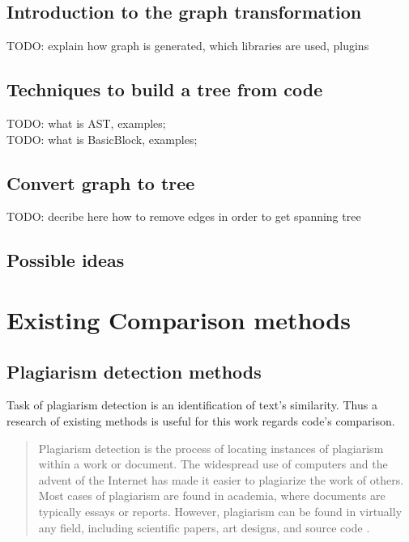 \documentclass{report}
\begin{document}
\section{Introduction to the graph transformation}
\label{sec:graph-transformation}

TODO: explain how graph is generated, which libraries are used, plugins

\section{Techniques to build a tree from code}
TODO: what is AST, examples;
\\
TODO: what is BasicBlock, examples;

\section{Convert graph to tree}
\label{sec: generate-to-tree}
TODO: decribe here how to remove edges in order to get spanning tree

\section{Possible ideas}


\chapter{Existing Comparison methods}
\section{Plagiarism detection methods}

Task of plagiarism detection is an identification of text's similarity. Thus a research of existing methods is useful for this work regards code's comparison.
\begin{quote} Plagiarism detection is the process of locating instances of plagiarism within a work or document. The widespread use of computers and the advent of the Internet has made it easier to plagiarize the work of others. Most cases of plagiarism are found in academia, where documents are typically essays or reports. However, plagiarism can be found in virtually any field, including scientific papers, art designs, and source code \cite{wiki_plagiarism}. \end{quote}
\end{document}
